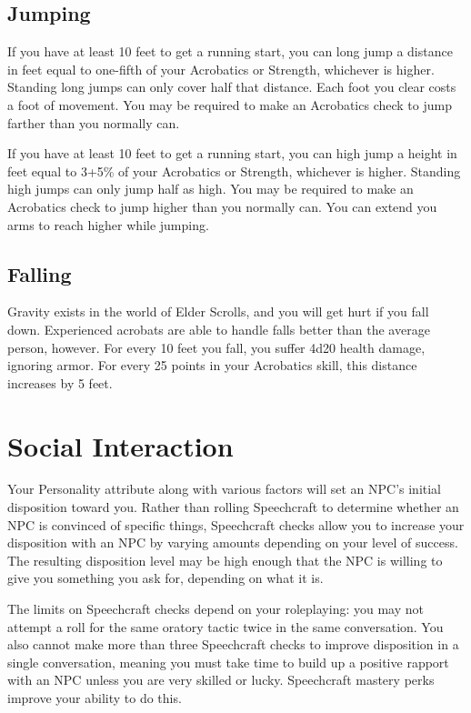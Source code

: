 \documentclass[12pt]{book}
\begin{document}
\subsection{Jumping}
If you have at least 10 feet to get a running start, you can long jump a distance in feet equal to one-fifth of your Acrobatics or Strength, whichever is higher. Standing long jumps can only cover half that distance. Each foot you clear costs a foot of movement. You may be required to make an Acrobatics check to jump farther than you normally can.

If you have at least 10 feet to get a running start, you can high jump a height in feet equal to 3+5\% of your Acrobatics or Strength, whichever is higher. Standing high jumps can only jump half as high. You may be required to make an Acrobatics check to jump higher than you normally can. You can extend you arms to reach higher while jumping.

\subsection{Falling}
Gravity exists in the world of Elder Scrolls, and you will get hurt if you fall down. Experienced acrobats are able to handle falls better than the average person, however. For every 10 feet you fall, you suffer 4d20 health damage, ignoring armor. For every 25 points in your Acrobatics skill, this distance increases by 5 feet.

\section{Social Interaction}
Your Personality attribute along with various factors will set an NPC's initial disposition toward you. Rather than rolling Speechcraft to determine whether an NPC is convinced of specific things, Speechcraft checks allow you to increase your disposition with an NPC by varying amounts depending on your level of success. The resulting disposition level may be high enough that the NPC is willing to give you something you ask for, depending on what it is.

The limits on Speechcraft checks depend on your roleplaying: you may not attempt a roll for the same oratory tactic twice in the same conversation. You also cannot make more than three Speechcraft checks to improve disposition in a single conversation, meaning you must take time to build up a positive rapport with an NPC unless you are very skilled or lucky. Speechcraft mastery perks improve your ability to do this.
\end{document}
